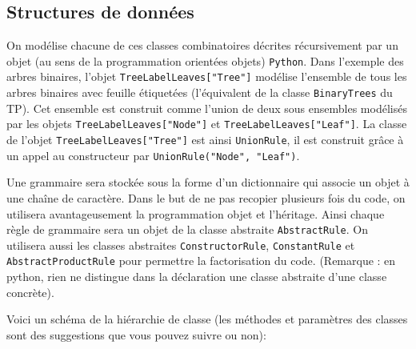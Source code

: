 \documentclass[11pt]{article}
\newcommand{\Python}{\texttt{Python}}
\begin{document}
\subsection{Structures de données}

On modélise chacune de ces classes combinatoires décrites récursivement par un
objet (au sens de la programmation orientées objets) \Python. Dans l'exemple
des arbres binaires, l'objet {\tt TreeLabelLeaves["Tree"]} modélise l'ensemble de
tous les arbres binaires avec feuille étiquetées (l'équivalent de la classe {\tt BinaryTrees} du TP). 
Cet ensemble est construit comme l'union de deux sous ensembles modélisés par 
les objets {\tt TreeLabelLeaves["Node"]} et {\tt TreeLabelLeaves["Leaf"]}.  
La classe de l'objet {\tt TreeLabelLeaves["Tree"]} est
ainsi {\tt UnionRule}, il est construit grâce à un appel au constructeur par
{\tt UnionRule("Node", "Leaf")}.


Une grammaire sera stockée sous la forme d'un dictionnaire qui associe un
objet à une chaîne de caractère. Dans le but de ne pas recopier plusieurs fois
du code, on utilisera avantageusement la programmation objet et
l'héritage. Ainsi chaque règle de grammaire sera un objet de la classe
abstraite \texttt{AbstractRule}. On utilisera aussi les classes abstraites
{\tt ConstructorRule}, {\tt ConstantRule} et {\tt AbstractProductRule}
pour permettre la factorisation du code. (Remarque : en python, rien 
ne distingue dans la déclaration une classe abstraite d'une classe concrète).
\pagebreak

Voici un schéma de la
hiérarchie de classe (les méthodes et paramètres des classes sont des suggestions que vous pouvez suivre ou non): \bigskip
\end{document}
